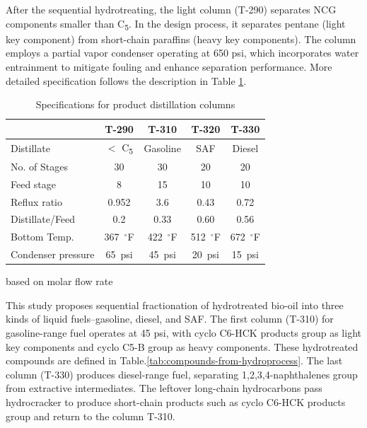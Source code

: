 \documentclass[11pt]{article}
\begin{document}
After the sequential hydrotreating, the light column (T-290) separates NCG components smaller than C\textsubscript{5}.
In the design process, it separates pentane (light key component) from short-chain paraffins (heavy key components). 
The column employs a partial vapor condenser operating at 650 psi, which incorporates water entrainment to mitigate fouling and enhance separation performance. 
More detailed specification follows the description in Table \ref{tab:distil}.

\begin{table}[tbp]
\centering
\caption{Specifications for product distillation columns} \label{tab:distil}
\begin{threeparttable}
\begin{tabular}{l|c|c|c|c}
\toprule
\textbf{} & \textbf{T-290} & \textbf{T-310} & \textbf{T-320} & \textbf{T-330} \\
\midrule \midrule
Distillate & $<$ C\textsubscript{5} & Gasoline & SAF & Diesel \\
No. of Stages & 30 & 30 & 20 & 20 \\
Feed stage & 8 & 15 & 10 & 10 \\
Reflux ratio\tnote{a} & 0.952 & 3.6 & 0.43 & 0.72 \\
Distillate/Feed\tnote{a} & 0.2 & 0.33 & 0.60 & 0.56 \\
Bottom Temp. & 367~$^{\circ}$F & 422~$^{\circ}$F & 512~$^{\circ}$F & 672~$^{\circ}$F \\
Condenser pressure & 65~psi & 45~psi & 20~psi & 15~psi \\
\bottomrule
\end{tabular}
\begin{tablenotes}
\footnotesize
\item[a] based on molar flow rate
\end{tablenotes}
\end{threeparttable}
\end{table}

    This study proposes sequential fractionation of hydrotreated bio-oil into three kinds of liquid fuels--gasoline, diesel, and SAF.
    The first column (T-310) for gasoline-range fuel operates at 45 psi, with cyclo C6-HCK products group as light key components and cyclo C5-B group as heavy components. 
    These hydrotreated compounds are defined in Table.\ref{tab:compounds-from-hydroprocess}.
    The last column (T-330) produces diesel-range fuel, separating 1,2,3,4-naphthalenes group from extractive intermediates.  
    The leftover long-chain hydrocarbons pass hydrocracker to produce short-chain products such as cyclo C6-HCK products group and return to the column T-310. 
\end{document}
